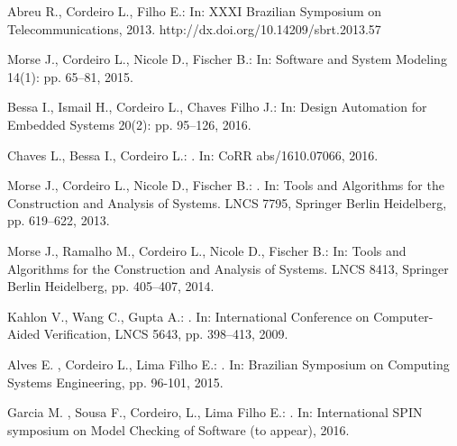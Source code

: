 \documentclass{acm_sen_article}
\begin{document}
{{\begin{thebibliography}{1}
Abreu R., Cordeiro L., Filho E.:
\newblock In: XXXI Brazilian Symposium on Telecommunications, 2013.
\newblock http://dx.doi.org/10.14209/sbrt.2013.57

Morse J., Cordeiro L., Nicole D., Fischer B.:
\newblock In: Software and System Modeling 14(1): pp. 65--81, 2015.

Bessa I., Ismail H., Cordeiro L., Chaves Filho J.:
\newblock In: Design Automation for Embedded Systems 20(2): pp. 95--126, 2016.

Chaves L., Bessa I., Cordeiro L.:
. 
\newblock In: CoRR abs/1610.07066, 2016.

Morse J., Cordeiro L., Nicole D., Fischer B.:
.
\newblock In: Tools and Algorithms for the Construction and Analysis of
  Systems. LNCS 7795, Springer Berlin Heidelberg, pp. 619--622, 2013.

Morse J., Ramalho M., Cordeiro L., Nicole D., Fischer B.:
\newblock In: Tools and Algorithms for the Construction and Analysis of
  Systems. LNCS 8413, Springer Berlin Heidelberg, pp. 405--407, 2014.

Kahlon V., Wang C., Gupta A.:
.
\newblock In: International Conference on Computer-Aided Verification, LNCS 5643, pp. 398--413, 2009.

Alves E. , Cordeiro L., Lima Filho E.:
. 
\newblock In: Brazilian Symposium on Computing Systems Engineering, pp. 96-101, 2015.

Garcia M. , Sousa F., Cordeiro, L., Lima Filho E.: 
. 
\newblock In: International SPIN symposium on Model Checking of Software (to appear), 2016.


\end{thebibliography}}}
\end{document}
